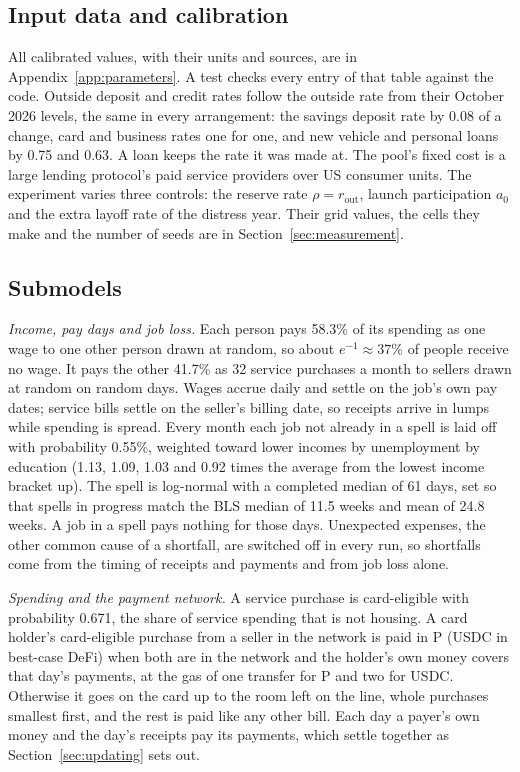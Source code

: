 \subsection{Input data and calibration}

All calibrated values, with their units and sources, are in Appendix~\ref{app:parameters}. A test checks every
entry of that table against the code. Outside deposit and credit rates follow the outside rate from their October
2026 levels, the same in every arrangement: the savings deposit rate by 0.08 of a change, card and business rates
one for one, and new vehicle and personal loans by 0.75 and 0.63. A loan keeps the rate it was made at. The pool's
fixed cost is a large lending protocol's paid service providers over US consumer units. The experiment varies three
controls: the reserve rate $\rho = r_{\mathrm{out}}$, launch participation $a_{0}$ and the extra layoff rate of the
distress year. Their grid values, the cells they make and the number of seeds are in
Section~\ref{sec:measurement}.

\subsection{Submodels}

\emph{Income, pay days and job loss.} Each person pays 58.3\% of its spending as one wage to one other person drawn
at random, so about $e^{-1} \approx 37\%$ of people receive no wage. It pays the other 41.7\% as 32 service purchases a month to
sellers drawn at random on random days. Wages accrue daily and settle on the job's own pay dates; service bills
settle on the seller's billing date, so receipts arrive in lumps while spending is spread. Every month each job not
already in a spell is laid off with probability 0.55\%, weighted toward lower incomes by unemployment by education
(1.13, 1.09, 1.03 and 0.92 times the average from the lowest income bracket up). The spell is log-normal with a
completed median of 61 days, set so that spells in progress match the BLS median of 11.5 weeks and mean of 24.8
weeks. A job in a spell pays nothing for those days. Unexpected expenses, the other common cause of a shortfall,
are switched off in every run, so shortfalls come from the timing of receipts and payments and from job loss alone.

\emph{Spending and the payment network.} A service purchase is card-eligible with probability 0.671, the share of
service spending that is not housing. A card holder's card-eligible purchase from a seller in the network is paid in
P (USDC in best-case DeFi) when both are in the network and the holder's own money covers that day's payments, at
the gas of one transfer for P and two for USDC. Otherwise it goes on
the card up to the room left on the line, whole purchases smallest first, and the rest is paid like any other bill.
Each day a payer's own money and the day's receipts pay its payments, which settle together as
Section~\ref{sec:updating} sets out.

